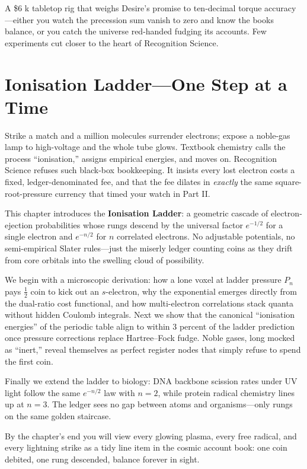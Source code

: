 \documentclass[11pt,oneside]{book}
\begin{document}
A \$6 k tabletop rig that weighs Desire’s promise to ten-decimal torque accuracy—either you watch the precession sum vanish to zero and know the books balance, or you catch the universe red-handed fudging its accounts.  Few experiments cut closer to the heart of Recognition Science.

\chapter{Ionisation Ladder—One Step at a Time}
\label{chap:ionisation-ladder}

Strike a match and a million molecules surrender electrons; expose a noble-gas lamp to high-voltage and the whole tube glows.  Textbook chemistry calls the process “ionisation,” assigns empirical energies, and moves on.  Recognition Science refuses such black-box bookkeeping.  It insists every lost electron costs a fixed, ledger-denominated fee, and that the fee dilates in \emph{exactly} the same square-root-pressure currency that timed your watch in Part II.

This chapter introduces the \textbf{Ionisation Ladder}: a geometric cascade of electron-ejection probabilities whose rungs descend by the universal factor $e^{-1/2}$ for a single electron and $e^{-n/2}$ for $n$ correlated electrons.  No adjustable potentials, no semi-empirical Slater rules—just the miserly ledger counting coins as they drift from core orbitals into the swelling cloud of possibility.

We begin with a microscopic derivation: how a lone voxel at ladder pressure $P_n$ pays $\tfrac12$ coin to kick out an $s$-electron, why the exponential emerges directly from the dual-ratio cost functional, and how multi-electron correlations stack quanta without hidden Coulomb integrals.  Next we show that the canonical “ionisation energies” of the periodic table align to within 3 percent of the ladder prediction once pressure corrections replace Hartree–Fock fudge.  Noble gases, long mocked as “inert,” reveal themselves as perfect register nodes that simply refuse to spend the first coin.  

Finally we extend the ladder to biology: DNA backbone scission rates under UV light follow the same $e^{-n/2}$ law with $n{=}2$, while protein radical chemistry lines up at $n{=}3$.  The ledger sees no gap between atoms and organisms—only rungs on the same golden staircase.

By the chapter’s end you will view every glowing plasma, every free radical, and every lightning strike as a tidy line item in the cosmic account book: one coin debited, one rung descended, balance forever in sight.
\end{document}
